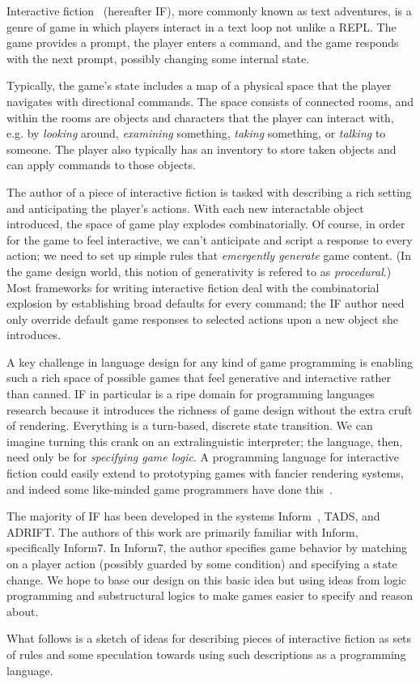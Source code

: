 Interactive fiction~\cite{Montfort:2004:TLP:940352} (hereafter IF),
more commonly known as text adventures, is a genre of game in which
players interact in a text loop not unlike a REPL. The game provides a
prompt, the player enters a command, and the game responds with the
next prompt, possibly changing some internal state.

Typically, the game's state includes a map of a physical space that the
player navigates with directional commands. The space consists of connected
rooms, and within the rooms are objects and characters that the player can
interact with, e.g. by {\em looking} around, {\em examining} something, 
{\em taking} something, or {\em talking} to someone. The player also
typically has an inventory to store taken objects and can apply commands to
those objects.

The author of a piece of interactive fiction is tasked with describing a
rich setting and anticipating the player's actions.  With each new
interactable object introduced, the space of game play explodes
combinatorially. Of course, in order for the game to feel interactive, we
can't anticipate and script a response to every action; we need to set up
simple rules that {\em emergently generate} game content.  (In the game
design world, this notion of generativity is refered to as {\em
procedural}.) Most frameworks for writing interactive fiction deal with the
combinatorial explosion by establishing broad defaults for every command;
the IF author need only override default game responses to selected actions
upon a new object she introduces.

A key challenge in language design for any kind of game programming is
enabling such a rich space of possible games that feel generative and
interactive rather than canned.  IF in particular is a ripe domain for
programming languages research because it introduces the richness of game
design without the extra cruft of rendering. Everything is a turn-based,
discrete state transition. We can imagine turning this crank on an
extralinguistic interpreter; the language, then, need only be for {\em
specifying game logic}. A programming language for interactive fiction could
easily extend to prototyping games with fancier rendering systems, and
indeed some like-minded game programmers have done this~\cite{smith-mine-ore-2009}.

The majority of IF has been developed in the systems Inform~\cite{Nelson2005}, TADS,
and ADRIFT. The authors of this work are primarily familiar with Inform,
specifically Inform7. In Inform7, the author specifies game behavior by
matching on a player action (possibly guarded by some condition) and
specifying a state change. We hope to base our design on this basic idea
but using ideas from logic programming and substructural logics to make
games easier to specify and reason about.

What follows is a sketch of ideas for describing pieces of interactive
fiction as sets of rules and some speculation towards using such
descriptions as a programming language.
